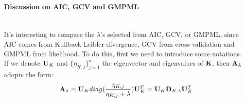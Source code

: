 \documentclass[11pt]{article}
\begin{document}
\paragraph{Discussion on AIC, GCV and GMPML}\mbox{}\\
It's interesting to compare the $\lambda$'s selected from AIC, GCV, or GMPML, since AIC comes from Kullback-Leibler divergence, GCV from cross-validation and GMPML from likelihood. To do this, first we need to introduce some notations.\\
If we denote ${\bf U}_K$ and $\{\eta_{K, j}\}_{j=1}^n$ the eigenvector and eigenvalues of ${\bf K}$, then ${\bf A}_\lambda$ adopts the form:
\begin{align*}
{\bf A}_\lambda={\bf U}_K diag(\frac{\eta_{K, j}}{\eta_{K, j}+\lambda}){\bf U}_K^T={\bf U}_K {\bf D}_{K,\lambda}{\bf U}_K^T
\end{align*}

\end{document}
